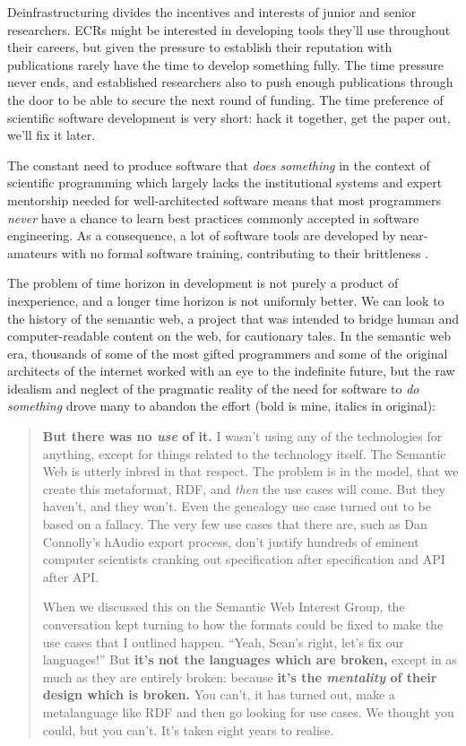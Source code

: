 \documentclass[notoc]{tufte-book}
\begin{document}
Deinfrastructuring divides the incentives and interests of junior and
senior researchers. ECRs might be interested in developing tools they'll
use throughout their careers, but given the pressure to establish their
reputation with publications rarely have the time to develop something
fully. The time pressure never ends, and established researchers also to
push enough publications through the door to be able to secure the next
round of funding. The time preference of scientific software development
is very short: hack it together, get the paper out, we'll fix it later.

The constant need to produce software that \emph{does something} in the
context of scientific programming which largely lacks the institutional
systems and expert mentorship needed for well-architected software means
that most programmers \emph{never} have a chance to learn best practices
commonly accepted in software engineering. As a consequence, a lot of
software tools are developed by near-amateurs with no formal software
training, contributing to their brittleness \citep{altschulAnatomySuccessfulComputational2013} .

The problem of time horizon in development is not purely a product of
inexperience, and a longer time horizon is not uniformly better. We can
look to the history of the semantic web, a project that was intended to
bridge human and computer-readable content on the web, for cautionary
tales. In the semantic web era, thousands of some of the most gifted
programmers and some of the original architects of the internet worked
with an eye to the indefinite future, but the raw idealism and neglect
of the pragmatic reality of the need for software to \emph{do something}
drove many to abandon the effort (bold is mine, italics in original):

\begin{quote}
\textbf{But there was no \emph{use} of it.} I wasn't using any of the
technologies for anything, except for things related to the technology
itself. The Semantic Web is utterly inbred in that respect. The problem
is in the model, that we create this metaformat, RDF, and \emph{then}
the use cases will come. But they haven't, and they won't. Even the
genealogy use case turned out to be based on a fallacy. The very few use
cases that there are, such as Dan Connolly's hAudio export process,
don't justify hundreds of eminent computer scientists cranking out
specification after specification and API after API.

When we discussed this on the Semantic Web Interest Group, the
conversation kept turning to how the formats could be fixed to make the
use cases that I outlined happen. ``Yeah, Sean's right, let's fix our
languages!'' But \textbf{it's not the languages which are broken,}
except in as much as they are entirely broken: because \textbf{it's the
\emph{mentality} of their design which is broken.} You can't, it has
turned out, make a metalanguage like RDF and then go looking for use
cases. We thought you could, but you can't. It's taken eight years to
realise. \citep{palmerDitchingSemanticWeb2008} 
\end{quote}
\end{document}
